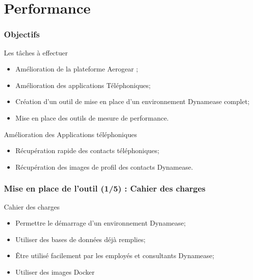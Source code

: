 \section{Performance}
\author{Kévin Moreau}


\begin{frame}
	\frametitle{Objectifs}

	\begin{block}{Les tâches à effectuer}
	 \begin{itemize}
      \item Amélioration de la plateforme Aerogear ;
	  \item Amélioration des applications Téléphoniques;
	  \item Création d'un outil de mise en place d'un environnement Dynamease complet;
	  \item Mise en place des outils de mesure de performance.
	 \end{itemize}
	\end{block}

	\begin{block}{Amélioration des Applications téléphoniques}
		\begin{itemize}
			\item Récupération rapide des contacts téléphoniques;
			\item Récupération des images de profil des contacts Dynamease.
		\end{itemize}
	\end{block}

    
\end{frame}

\begin{frame}
	\frametitle{Mise en place de l'outil (1/5) : Cahier des charges}

    \begin{block}{Cahier des charges}
	 \begin{itemize}
	  \item Permettre le démarrage d'un environnement Dynamease;
	  \item Utiliser des bases de données déjà remplies;
	  \item Être utilisé facilement par les employés et consultants Dynamease;
	  \item Utiliser des images Docker
	 \end{itemize}
	\end{block}

\end{frame}


